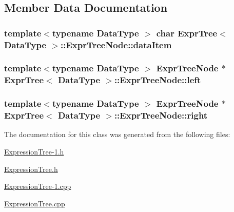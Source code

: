 \subsection{Member Data Documentation}
\hypertarget{class_expr_tree_1_1_expr_tree_node_a8985f5eb0eb91c438c186a1d55116783}{
\subsubsection[{data\+Item}]{\setlength{\rightskip}{0pt plus 5cm}template$<$typename Data\+Type $>$ char {\bf Expr\+Tree}$<$ Data\+Type $>$\+::Expr\+Tree\+Node\+::data\+Item}}\label{class_expr_tree_1_1_expr_tree_node_a8985f5eb0eb91c438c186a1d55116783}
\hypertarget{class_expr_tree_1_1_expr_tree_node_ad51eb6b222e7589c48c47344ca564e04}{
\subsubsection[{left}]{\setlength{\rightskip}{0pt plus 5cm}template$<$typename Data\+Type $>$ {\bf Expr\+Tree\+Node} $\ast$ {\bf Expr\+Tree}$<$ Data\+Type $>$\+::Expr\+Tree\+Node\+::left}}\label{class_expr_tree_1_1_expr_tree_node_ad51eb6b222e7589c48c47344ca564e04}
\hypertarget{class_expr_tree_1_1_expr_tree_node_a7af02913a798115ad57793c470262c04}{
\subsubsection[{right}]{\setlength{\rightskip}{0pt plus 5cm}template$<$typename Data\+Type $>$ {\bf Expr\+Tree\+Node} $\ast$ {\bf Expr\+Tree}$<$ Data\+Type $>$\+::Expr\+Tree\+Node\+::right}}\label{class_expr_tree_1_1_expr_tree_node_a7af02913a798115ad57793c470262c04}


The documentation for this class was generated from the following files\+:\begin{DoxyCompactItemize}
\item 
\hyperlink{_expression_tree-1_8h}{Expression\+Tree-\/1.\+h}\item 
\hyperlink{_expression_tree_8h}{Expression\+Tree.\+h}\item 
\hyperlink{_expression_tree-1_8cpp}{Expression\+Tree-\/1.\+cpp}\item 
\hyperlink{_expression_tree_8cpp}{Expression\+Tree.\+cpp}\end{DoxyCompactItemize}

